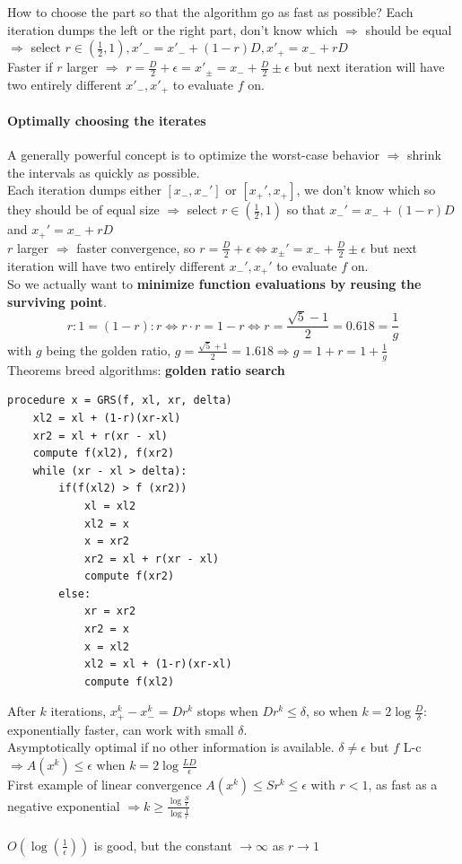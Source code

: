 \documentclass[10pt]{report}
\begin{document}
How to choose the part so that the algorithm go as fast as possible? Each iteration dumps the left or the right part, don't know which $\Rightarrow$ should be equal $\Rightarrow$ select $r \in (\frac{1}{2}, 1), x'_- = x'_- + (1 - r)D, x'_+ = x_- + rD$\\
Faster if $r$ larger $\Rightarrow$ $r = \frac{D}{2} + \epsilon = x'_\pm = x_- + \frac{D}{2} \pm \epsilon$ but next iteration will have two entirely different $x'_-, x'_+$ to evaluate $f$ on.
\paragraph{Optimally choosing the iterates} A generally powerful concept is to optimize the worst-case behavior $\Rightarrow$ shrink the intervals as quickly as possible.\\
Each iteration dumps either $[x_-, x_-']$ or $[x_+', x_+]$, we don't know which so they should be of equal size $\Rightarrow$ select $r\in (\frac{1}{2},1)$ so that $x_-' = x_- + (1-r)D$ and $x_+' = x_- + rD$\\
$r$ larger $\Rightarrow$ faster convergence, so $r = \frac{D}{2} + \epsilon \Leftrightarrow x_\pm' = x_- + \frac{D}{2}\pm\epsilon$ but next iteration will have two entirely different $x_-', x_+'$ to evaluate $f$ on.\\
So we actually want to \textbf{minimize function evaluations by reusing the surviving point}. $$r : 1 = (1 - r) : r \Leftrightarrow r\cdot r = 1 - r \Leftrightarrow r = \frac{\sqrt{5} - 1}{2} = 0.618 = \frac{1}{g}$$ with $g$ being the golden ratio, $g = \frac{\sqrt{5} + 1}{2} = 1.618 \Rightarrow g = 1 + r = 1 + \frac{1}{g}$\\
Theorems breed algorithms: \textbf{golden ratio search}\\
\begin{lstlisting}[style=myPython]
procedure x = GRS(f, xl, xr, delta)
	xl2 = xl + (1-r)(xr-xl)
	xr2 = xl + r(xr - xl)
	compute f(xl2), f(xr2)
	while (xr - xl > delta):
		if(f(xl2) > f (xr2))
			xl = xl2
			xl2 = x
			x = xr2
			xr2 = xl + r(xr - xl)
			compute f(xr2)
		else:
			xr = xr2
			xr2 = x
			x = xl2
			xl2 = xl + (1-r)(xr-xl)
			compute f(xl2)
\end{lstlisting}
After $k$ iterations, $x_+^k - x_-^k = Dr^k$ stops when $Dr^k \leq \delta$, so when $k = 2\log\frac{D}{\delta}$: exponentially faster, can work with small $\delta$.\\
Asymptotically optimal if no other information is available. $\delta \neq \epsilon$ but $f$ L-c $\Rightarrow A(x^k) \leq \epsilon$ when $k = 2\log\frac{LD}{\epsilon}$\\
First example of linear convergence $A(x^k) \leq Sr^k \leq \epsilon$ with $r < 1$, as fast as a negative exponential $\Rightarrow k \geq \frac{\displaystyle \log\frac{S}{\epsilon}}{\displaystyle \log\frac{1}{r}}$\\\\
$O(\log(\frac{1}{\epsilon}))$ is good, but the constant $\rightarrow\infty$ as $r\rightarrow 1$
\end{document}
